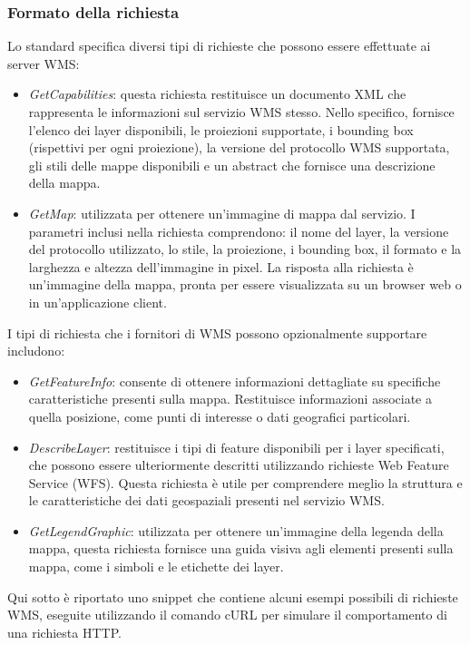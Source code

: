 \subsubsection{Formato della richiesta}

Lo standard specifica diversi tipi di richieste che possono essere effettuate ai server WMS:
\begin{itemize}
      \item \textit{GetCapabilities}: questa richiesta restituisce un documento XML che rappresenta le informazioni sul servizio WMS stesso. Nello specifico, fornisce l'elenco dei layer disponibili, le proiezioni supportate, i bounding box (rispettivi per ogni proiezione), la versione del protocollo WMS supportata, gli stili delle mappe disponibili e un abstract che fornisce una descrizione della mappa.     
      \item \textit{GetMap}: utilizzata per ottenere un'immagine di mappa dal servizio. I parametri inclusi nella richiesta comprendono: il nome del layer, la versione del protocollo utilizzato, lo stile, la proiezione, i bounding box, il formato e la larghezza e altezza dell'immagine in pixel. La risposta alla richiesta è un'immagine della mappa, pronta per essere visualizzata su un browser web o in un'applicazione client.
\end{itemize}
I tipi di richiesta che i fornitori di WMS possono opzionalmente supportare includono:
\begin{itemize}
      \item \textit{GetFeatureInfo}: consente di ottenere informazioni dettagliate su specifiche caratteristiche presenti sulla mappa. Restituisce informazioni associate a quella posizione, come punti di interesse o dati geografici particolari.
      \item \textit{DescribeLayer}: restituisce i tipi di feature disponibili per i layer specificati, che possono essere ulteriormente descritti utilizzando richieste Web Feature Service (WFS). Questa richiesta è utile per comprendere meglio la struttura e le caratteristiche dei dati geospaziali presenti nel servizio WMS.
      \item \textit{GetLegendGraphic}: utilizzata per ottenere un'immagine della legenda della mappa, questa richiesta fornisce una guida visiva agli elementi presenti sulla mappa, come i simboli e le etichette dei layer.
\end{itemize}
Qui sotto è riportato uno snippet che contiene alcuni esempi possibili di richieste WMS, eseguite utilizzando il comando cURL per simulare il comportamento di una richiesta HTTP.

